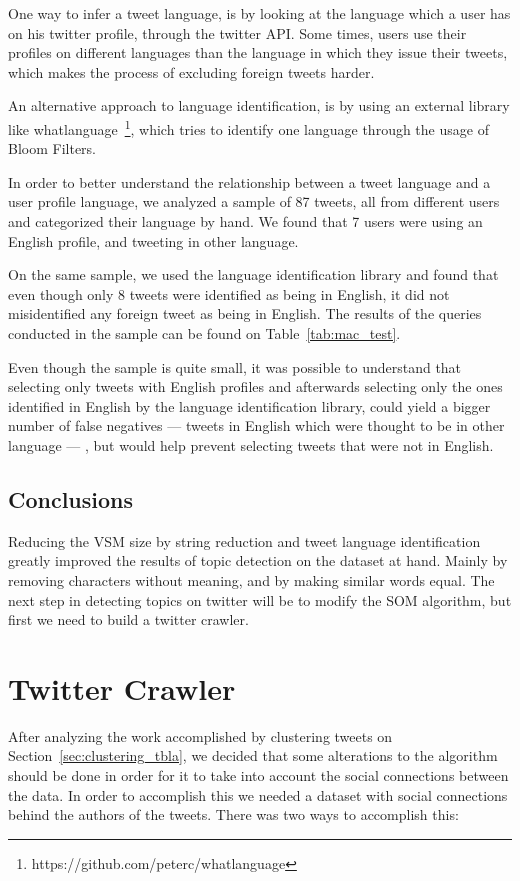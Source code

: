 One way to infer a tweet language, is by looking at the language which a user has on his twitter profile, through the twitter API. Some times, users use their profiles on different languages than the language in which they issue their tweets, which makes the process of excluding foreign tweets harder.

An alternative approach to language identification, is by using an external library like whatlanguage~\footnote{https://github.com/peterc/whatlanguage}, which tries to identify one language through the usage of Bloom Filters.  

In order to better understand the relationship between a tweet language and a user profile language, we analyzed a sample of 87 tweets, all from different users and categorized their language by hand. We found that 7 users were using an English profile, and tweeting in other language.

On the same sample, we used the language identification library and found that even though only 8 tweets were identified as being in English, it did not misidentified any foreign tweet as being in English. The results of the queries conducted in the sample can be found on Table~\ref{tab:mac_test}.  



Even though the sample is quite small, it was possible to understand that selecting only tweets with English profiles and afterwards selecting only the ones identified in English by the language identification library, could yield a bigger number of false negatives --- tweets in English which were thought to be in other language ---  , but would help prevent selecting tweets that were not in English.

\subsection{Conclusions}
\label{sub:conclusions}
Reducing the \ac{VSM} size by string reduction and tweet language identification greatly improved the results of topic detection on the dataset at hand. Mainly by removing characters without meaning, and by making similar words equal. The next step in detecting topics on twitter will be to modify the \ac{SOM} algorithm, but first we need to build a twitter crawler. 

\section{Twitter Crawler}
\label{sec:twitter_crawler}
After analyzing the work accomplished by clustering tweets on Section~\ref{sec:clustering_tbla}, we decided that some alterations to the algorithm should be done in order for it to take into account the social connections between the data. In order to accomplish this we needed a dataset with social connections behind the authors of the tweets. There was two ways to accomplish this: 


